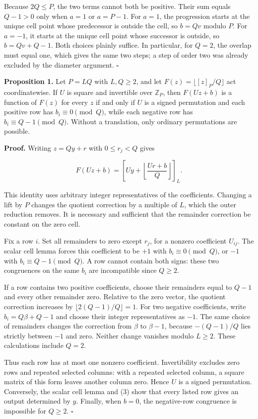 \documentclass[
]{article}
\begin{document}
Because \(2Q\le P\), the two terms cannot both be positive. Their sum
equals \(Q-1>0\) only when \(a=1\) or \(a=P-1\). For \(a=1\), the
progression starts at the unique cell point whose predecessor is outside
the cell, so \(b=Qv\) modulo \(P\). For \(a=-1\), it starts at the
unique cell point whose successor is outside, so \(b=Qv+Q-1\). Both
choices plainly suffice. In particular, for \(Q=2\), the overlap must
equal one, which gives the same two steps; a step of order two was
already excluded by the diameter argument. \(\square\)

\textbf{Proposition 1.} Let \(P=LQ\) with \(L,Q\ge2\), and let
\(F(z)=\lfloor[z]_P/Q\rfloor\) act coordinatewise. If \(U\) is square
and invertible over \(\mathbb Z_P\), then \(F(Uz+b)\) is a function of
\(F(z)\) for every \(z\) if and only if \(U\) is a signed permutation
and each positive row has \(b_i\equiv0\pmod Q\), while each negative row
has \(b_i\equiv Q-1\pmod Q\). Without a translation, only ordinary
permutations are possible.

\textbf{Proof.} Writing \(z=Qy+r\) with \(0\le r_j<Q\) gives

\[
F(Uz+b)=\left[Uy+\left\lfloor\frac{Ur+b}{Q}\right\rfloor\right]_L.
\tag{3}
\]

This identity uses arbitrary integer representatives of the
coefficients. Changing a lift by \(P\) changes the quotient correction
by a multiple of \(L\), which the outer reduction removes. It is
necessary and sufficient that the remainder correction be constant on
the zero cell.

Fix a row \(i\). Set all remainders to zero except \(r_j\), for a
nonzero coefficient \(U_{ij}\). The scalar cell lemma forces this
coefficient to be \(+1\) with \(b_i\equiv0\pmod Q\), or \(-1\) with
\(b_i\equiv Q-1\pmod Q\). A row cannot contain both signs: these two
congruences on the same \(b_i\) are incompatible since \(Q\ge2\).

If a row contains two positive coefficients, choose their remainders
equal to \(Q-1\) and every other remainder zero. Relative to the zero
vector, the quotient correction increases by
\(\lfloor2(Q-1)/Q\rfloor=1\). For two negative coefficients, write
\(b_i=Q\beta+Q-1\) and choose their integer representatives as \(-1\).
The same choice of remainders changes the correction from \(\beta\) to
\(\beta-1\), because \(-(Q-1)/Q\) lies strictly between \(-1\) and zero.
Neither change vanishes modulo \(L\ge2\). These calculations include
\(Q=2\).

Thus each row has at most one nonzero coefficient. Invertibility
excludes zero rows and repeated selected columns: with a repeated
selected column, a square matrix of this form leaves another column
zero. Hence \(U\) is a signed permutation. Conversely, the scalar cell
lemma and (3) show that every listed row gives an output determined by
\(y\). Finally, when \(b=0\), the negative-row congruence is impossible
for \(Q\ge2\). \(\square\)
\end{document}
